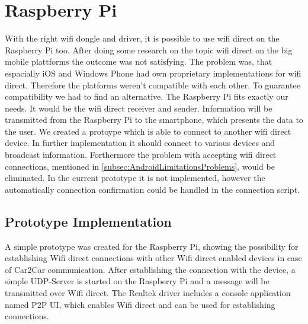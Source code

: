 \section{Raspberry Pi}
\label{sec:RaspberryPi}
With the right wifi dongle and driver, it is possible to use wifi direct on the Raspberry Pi too. After doing some research on the topic wifi direct on the big mobile plattforms the outcome was not satisfying. The problem was, that espacially iOS and Windows Phone had own proprietary implementations for wifi direct. Therefore the platforms weren't compatible with each other. To guarantee compatibility we had to find an alternative. The Raspberry Pi fits exactly our needs. It would be the wifi direct receiver and sender. Information will be transmitted from the Raspberry Pi to the smartphone, which presents the data to the user. We created a protoype which is able to connect to another wifi direct device. In further implementation it should connect to various devices and broadcast information. Forthermore the problem with accepting wifi direct connections, mentioned in \ref{subsec:AndroidLimitationsProblems}, would be eliminated. In the current prototype it is not implemented, however the automatically connection confirmation could be handled in the connection script.

\subsection*{Prototype Implementation}
\label{subsec:RaspberryPrototype}
A simple prototype was created for the Raspberry Pi, showing the possibility for establishing Wifi direct connections with other Wifi direct enabled devices in case of Car2Car communication. After establishing the connection with the device, a simple UDP-Server is started on the Raspberry Pi and a message will be transmitted over Wifi direct. The Realtek driver includes a console application named P2P UI, which enables Wifi direct and can be used for establishing connections. 

